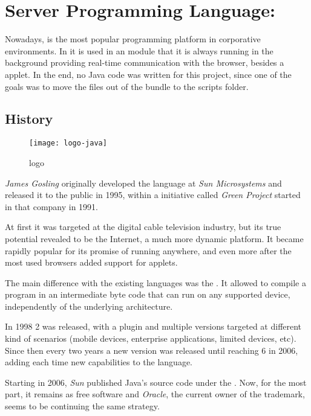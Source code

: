 \section{Server Programming Language: } %
\label{sec:java}

Nowadays,  is the most popular programming platform in corporative environments.
In  it is used in an  module that it is always running in the background providing real-time communication with the browser, besides a  applet.
In the end, no Java code was written for this project, since one of the goals was to move the files out of the  bundle to the  scripts folder.

\subsection{History} %
\label{sub:javahistory}

\begin{wrapfigure}{r}{0.5\textwidth}
  \centering
    \texttt{[image: logo-java]}
  \caption{ logo}
  \label{fig:logo-java}
\end{wrapfigure}

\emph{James Gosling} originally developed the language at \emph{Sun Microsystems} and released it to the public in 1995, within a initiative called \emph{Green Project} started in that company in 1991.

At first it was targeted at the digital cable television industry, but its true potential revealed to be the Internet, a much more dynamic platform.
It became rapidly popular for its promise of running anywhere, and even more after the most used browsers added support for  applets.

The main difference with the existing languages was the .
It allowed to compile a program in an intermediate byte code that can run on any  supported device, independently of the underlying architecture.

In 1998  2 was released, with a  plugin and multiple versions targeted at different kind of scenarios (mobile devices, enterprise applications, limited devices, etc).
Since then every two years a new version was released until reaching  6 in 2006, adding each time new capabilities to the language.

Starting in 2006, \emph{Sun} published Java's source code under the . Now, for the most part, it remains as free software and \emph{Oracle}, the current owner of the trademark, seems to be continuing the same strategy.

